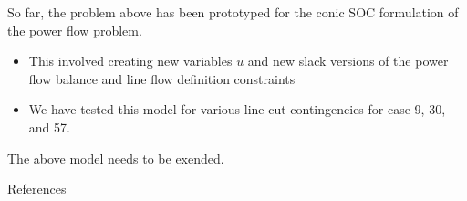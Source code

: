 \documentclass[xcolor=dvipsnames]{beamer}
\begin{document}
\begin{frame}
So far, the problem above has been prototyped for the conic SOC formulation of the power flow problem. 
\begin{itemize}
\item This involved creating new variables $u$ and new slack versions of the power flow balance and line flow definition constraints
\item We have tested this model for various line-cut contingencies for case 9, 30, and 57.
\end{itemize}
The above model needs to be exended.
\end{frame}

 


\begin{frame}[allowframebreaks]{References} 

 
%



\end{frame}
      
\end{document}
